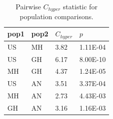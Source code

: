 \documentclass[9pt,twocolumn,twoside,lineno]{BioRxiv}
\begin{document}
\begin{table}[h!]

\centering
\begin{tabular}{@{}llll@{}}
\toprule
pop1 & pop2 & $C_{hyper}$   & $p$  \\ \midrule
US   & MH   & 3.82 & 1.11E-04 \\
US   & GH   & 6.17 & 8.00E-10 \\
MH   & GH   & 4.37 & 1.24E-05 \\
US   & AN   & 3.51 & 3.37E-04 \\
MH   & AN   & 2.73 & 4.43E-03 \\
GH   & AN   & 3.16 & 1.16E-03 \\ \bottomrule
\end{tabular}
\label{tab:table1}
\caption{Pairwise $C_{hyper}$ statistic for population comparisons.}
\end{table}

\clearpage

\renewcommand{\thefigure}{S\arabic{figure}}
\renewcommand{\thetable}{S\arabic{table}}%
\end{document}
